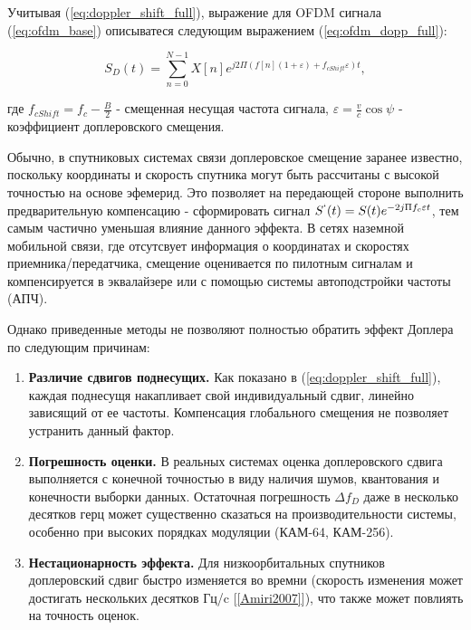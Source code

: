 Учитывая (\ref{eq:doppler_shift_full}), выражение для OFDM сигнала (\ref{eq:ofdm_base})
описыватеся следующим выражением (\ref{eq:ofdm_dopp_full}):

\begin{equation}
    S_D(t) = \sum_{n = 0}^{N - 1} X[n] e^{j 2 \Pi (f[n](1 + \varepsilon ) + f_{cShift}\varepsilon) t},
    \label{eq:ofdm_dopp_full}
\end{equation}

\noindent где $f_{cShift} = f_c - \frac{B}{2}$ - смещенная несущая частота сигнала, $\varepsilon = \frac{v}{c} \cos \psi$ - коэффициент доплеровского смещения.

Обычно, в спутниковых системах связи доплеровское смещение заранее известно, поскольку координаты
 и скорость спутника могут быть рассчитаны с высокой точностью на основе эфемерид. Это позволяет на передающей
 стороне выполнить предварительную компенсацию - сформировать сигнал $S^`(t) = S(t) e^{- 2 j \Pi f_{c} \varepsilon t}$,
 тем самым частично уменьшая влияние данного эффекта.
В сетях наземной мобильной связи, где отсутсвует информация о координатах и скоростях приемника/передатчика,
смещение оценивается по пилотным сигналам и компенсируется в эквалайзере или с помощью системы автоподстройки частоты (АПЧ).

Однако приведенные методы не позволяют полностью обратить эффект Доплера по следующим причинам:

\begin{enumerate}
    \item \textbf{Различие сдвигов поднесущих.} Как показано в (\ref{eq:doppler_shift_full}), каждая
    поднесущя накапливает свой индивидуальный сдвиг, линейно зависящий от ее частоты. Компенсация глобального
    смещения не позволяет устранить данный фактор.
    \item \textbf{Погрешность оценки.} В реальных системах оценка доплеровского сдвига выполняется с конечной
    точностью в виду наличия шумов, квантования и конечности выборки данных. Остаточная погрешность $\Delta f_D$
    даже в несколько десятков герц может существенно сказаться на производительности системы, особенно при высоких
    порядках модуляции (КАМ-64, КАМ-256).

    \item \textbf{Нестационарность эффекта.} Для низкоорбитальных спутников доплеровский сдвиг быстро изменяется
    во времни (скорость изменения может достигать нескольких десятков Гц/c [\ref{Amiri2007}]), что также может повлиять
    на точность оценок.
\end{enumerate}

